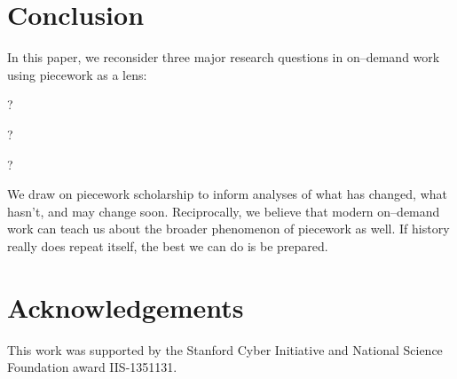 \documentclass[pn4226]{subfiles}
\begin{document}
\section{Conclusion}
In this paper, we reconsider three major research questions in on--demand work using piecework as a lens:
\begin{inlinelist}
  \item {}?
  \item {}?
  \item {}?
\end{inlinelist}
We draw on piecework scholarship to inform analyses of what has changed, what hasn't, and may change soon.
Reciprocally, we believe that modern on--demand work can teach us about the broader phenomenon of piecework as well.
If history really does repeat itself, the best we can do is be prepared.

\section{Acknowledgements}
This work was supported by the Stanford Cyber Initiative and National Science Foundation award IIS-1351131.
\end{document}
